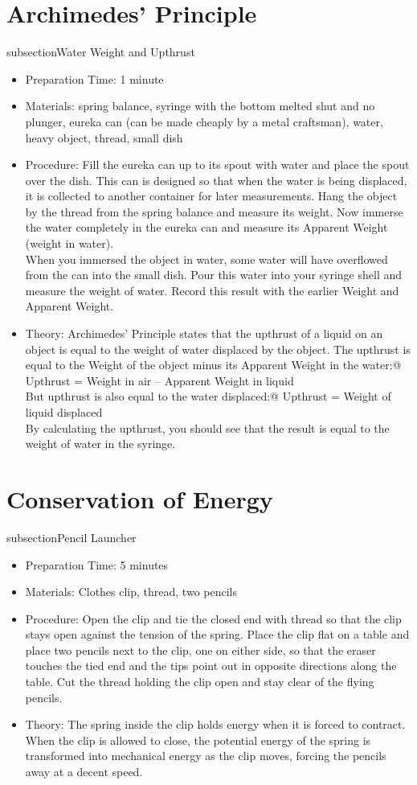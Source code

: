 \section{Archimedes’ Principle}
subsection{Water Weight and Upthrust}
\begin{itemize}
\item{Preparation Time: 1 minute}
\item{Materials: spring balance, syringe with the bottom melted shut and no plunger, eureka can (can be made cheaply by a metal craftsman), water, heavy object, thread, small dish}
\item{Procedure: Fill the eureka can up to its spout with water and place the spout over the dish. This can is designed so that when the water is being displaced, it is collected to another container for later measurements. Hang the object by the thread from the spring balance and measure its weight. Now immerse the water completely in the eureka can and measure its Apparent Weight (weight in water).\\
When you immersed the object in water, some water will have overflowed from the can into the small dish. Pour this water into your syringe shell and measure the weight of water. Record this result with the earlier Weight and Apparent Weight.}
\item{Theory: Archimedes’ Principle states that the upthrust of a liquid on an object is equal to the weight of water displaced by the object. The upthrust is equal to the Weight of the object minus its Apparent Weight in the water:@	Upthrust = Weight in air – Apparent Weight in liquid\\
But upthrust is also equal to the water displaced:@	Upthrust = Weight of liquid displaced\\
By calculating the upthrust, you should see that the result is equal to the weight of water in the syringe.}
\end{itemize}

\section{Conservation of Energy}
subsection{Pencil Launcher}
\begin{itemize}
\item{Preparation Time: 5 minutes}
\item{Materials: Clothes clip, thread, two pencils}
\item{Procedure: Open the clip and tie the closed end with thread so that the clip stays open against the tension of the spring. Place the clip flat on a table and place two pencils next to the clip, one on either side, so that the eraser touches the tied end and the tips point out in opposite directions along the table. Cut the thread holding the clip open and stay clear of the flying pencils.}
\item{Theory: The spring inside the clip holds energy when it is forced to contract. When the clip is allowed to close, the potential energy of the spring is transformed into mechanical energy as the clip moves, forcing the pencils away at a decent speed.}
\end{itemize}

